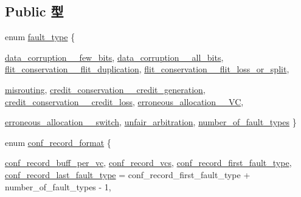 \subsection*{Public 型}
\begin{DoxyCompactItemize}
\item 
enum \hyperlink{classFaultModel_ad671111bc5a7e95e40340cfe3fb42f5f}{fault\_\-type} \{ \par
\hyperlink{classFaultModel_ad671111bc5a7e95e40340cfe3fb42f5fa5e3d5701e1e7ad68ef8ce6e61b343135}{data\_\-corruption\_\-\_\-few\_\-bits}, 
\hyperlink{classFaultModel_ad671111bc5a7e95e40340cfe3fb42f5fab3d1223d794fade671b2f63bc14a87e0}{data\_\-corruption\_\-\_\-all\_\-bits}, 
\hyperlink{classFaultModel_ad671111bc5a7e95e40340cfe3fb42f5fa2c8ad4552f3e7e28c7f43164f0cedea8}{flit\_\-conservation\_\-\_\-flit\_\-duplication}, 
\hyperlink{classFaultModel_ad671111bc5a7e95e40340cfe3fb42f5fadb758411e26971d262e497483d6becf7}{flit\_\-conservation\_\-\_\-flit\_\-loss\_\-or\_\-split}, 
\par
\hyperlink{classFaultModel_ad671111bc5a7e95e40340cfe3fb42f5fa78688a71f46ef6d5c915dacbbe65e564}{misrouting}, 
\hyperlink{classFaultModel_ad671111bc5a7e95e40340cfe3fb42f5faf319483361a14b6983f1e35359bc9afc}{credit\_\-conservation\_\-\_\-credit\_\-generation}, 
\hyperlink{classFaultModel_ad671111bc5a7e95e40340cfe3fb42f5fae7401498e51398da99c21cb2e0acf056}{credit\_\-conservation\_\-\_\-credit\_\-loss}, 
\hyperlink{classFaultModel_ad671111bc5a7e95e40340cfe3fb42f5fa40686ec21bc4f76a8013d2602a0b44c9}{erroneous\_\-allocation\_\-\_\-VC}, 
\par
\hyperlink{classFaultModel_ad671111bc5a7e95e40340cfe3fb42f5fa5037400f494a1f7f958dbf08e78bd457}{erroneous\_\-allocation\_\-\_\-switch}, 
\hyperlink{classFaultModel_ad671111bc5a7e95e40340cfe3fb42f5fa6bef1f2c7d102fec7019aa0cb548a275}{unfair\_\-arbitration}, 
\hyperlink{classFaultModel_ad671111bc5a7e95e40340cfe3fb42f5fa8fd6d2a4b94af175b1e18503d1f2200f}{number\_\-of\_\-fault\_\-types}
 \}
\item 
enum \hyperlink{classFaultModel_a892d29ada597232548383eb62e8cf21f}{conf\_\-record\_\-format} \{ \par
\hyperlink{classFaultModel_a892d29ada597232548383eb62e8cf21fa661e3c1c70f1697835634d6120c27fba}{conf\_\-record\_\-buff\_\-per\_\-vc}, 
\hyperlink{classFaultModel_a892d29ada597232548383eb62e8cf21faddfdcf5391cbdeaa8eddaced808b95c1}{conf\_\-record\_\-vcs}, 
\hyperlink{classFaultModel_a892d29ada597232548383eb62e8cf21fae775c7c2b6014dd0e7cf2a21110a1439}{conf\_\-record\_\-first\_\-fault\_\-type}, 
\hyperlink{classFaultModel_a892d29ada597232548383eb62e8cf21fae0a9a36ceaa84ed33759c149e73175db}{conf\_\-record\_\-last\_\-fault\_\-type} =  conf\_\-record\_\-first\_\-fault\_\-type + number\_\-of\_\-fault\_\-types -\/ 1, 

\end{DoxyCompactItemize}
